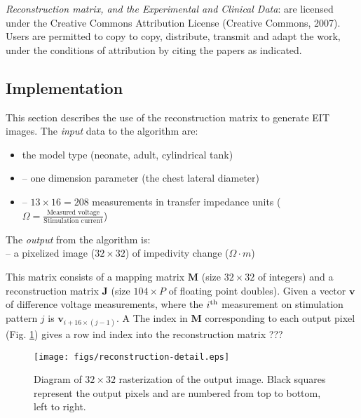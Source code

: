\documentclass[letterpaper,twocolumn,11pt]{article}
\newcommand{\vB}{\mbox{$\mathbf{v}$}}
\newcommand{\RB}{\mbox{$\mathbf{J}$}}
\newcommand{\MB}{\mbox{$\mathbf{M}$}}
\begin{document}
{\em Reconstruction matrix, and the Experimental and Clinical Data}:
   are licensed under the Creative Commons Attribution
   License (Creative Commons, 2007). Users are permitted
   to copy to copy, distribute, transmit and adapt the work,
   under the conditions of attribution by citing the
   papers as indicated.

\subsection{Implementation }
This section describes the use of the reconstruction
matrix to generate EIT images.
The {\em input} data to the algorithm are:
\begin{itemize}
\item[]
the model type (neonate, adult, cylindrical tank) 
\item[]
   -- one dimension parameter (the chest lateral diameter) 
\item[]
   -- $13\times 16=208$ measurements in transfer impedance units
      ($\Omega = \frac{\mbox{Measured voltage}}
                      {\mbox{Stimulation current}}$)
\end{itemize}

The {\em output} from the algorithm is:
\\
   -- a pixelized image ($32\times 32$) of 
      impedivity change ($\Omega \cdot m$)


      This matrix consists of a mapping matrix $\MB$ (size $32\times 32$ of
      integers) and a reconstruction matrix $\RB$ (size $104\times P$ of
      floating point doubles).
      Given a vector $\vB$ of difference voltage measurements, where
      the $i^{\rm th}$ measurement on stimulation pattern $j$ is
      $\vB_{i+16\times(j-1)}$. A 
      The index in $\MB$ corresponding to each output pixel
      (Fig. \ref{fig:reconst_detail}) gives a row ind index into the
      reconstruction matrix 
???

\begin{figure}[bhtp]
\begin{center}
  \texttt{[image: figs/reconstruction-detail.eps]}

\caption{ \label{fig:reconst_detail}
Diagram of $32\times 32$ rasterization of the output image. Black
squares represent the output pixels and are numbered from top
to bottom, left to right.
}
\end{center}
\end{figure}
\end{document}
